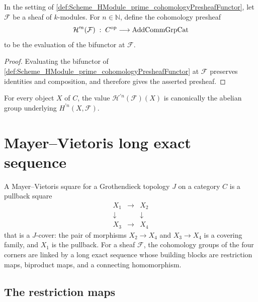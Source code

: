 \begin{definition}\leanok
  \label{def:Scheme_HModule_prime_cohomologyPresheaf}

  In the setting of \cref{def:Scheme_HModule_prime_cohomologyPresheafFunctor}, let \(\mathcal F\) be a sheaf of \(k\)-modules. For \(n \in \mathbb N\), define the cohomology presheaf
  \[
    \mathcal H^{\prime n}(\mathcal F) \;:\; C^{\mathrm{op}} \longrightarrow \mathrm{AddCommGrpCat}
  \]
  to be the evaluation of the bifunctor at \(\mathcal F\).
\end{definition}

\begin{proof}
  
  \leanok
  Evaluating the bifunctor of \cref{def:Scheme_HModule_prime_cohomologyPresheafFunctor} at \(\mathcal F\) preserves identities and composition, and therefore gives the asserted presheaf.
\end{proof}

\begin{remark}
  For every object \(X\) of \(C\), the value \(\mathcal H^{\prime n}(\mathcal F)(X)\) is canonically the abelian group underlying \(H^{\prime n}(X,\mathcal F)\).
\end{remark}

\section{Mayer--Vietoris long exact sequence}
\label{sec:hmodule_prime_mayer_vietoris}

A Mayer--Vietoris square for a Grothendieck topology \(J\) on a category \(C\) is a pullback square
\[
  \begin{array}{ccc}
    X_1 & \longrightarrow & X_2 \\
    \downarrow & & \downarrow \\
    X_3 & \longrightarrow & X_4
  \end{array}
\]
that is a \(J\)-cover: the pair of morphisms \(X_2 \to X_4\) and \(X_3 \to X_4\) is a covering family, and \(X_1\) is the pullback. For a sheaf \(\mathcal F\), the cohomology groups of the four corners are linked by a long exact sequence whose building blocks are restriction maps, biproduct maps, and a connecting homomorphism.

\subsection{The restriction maps}

